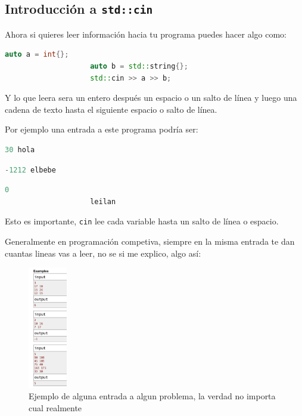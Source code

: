 \documentclass[12pt, fleqn]{report}                             %
\theoremstyle{break}                                            %
\newcommand{\textCode}[1]  { \texttt{#1} }                      %
\begin{document}
                    \cite{CPPReference}

            \subsection{Introducción a \textCode{std::cin}}
            
                Ahora si quieres leer información hacia tu programa puedes hacer algo como:
                \begin{lstlisting}[language=C++, gobble=20]
                    auto a = int{};
                    auto b = std::string{};
                    std::cin >> a >> b;        
                \end{lstlisting}

                Y lo que leera sera un entero después un espacio o un salto de línea y luego una cadena de
                texto hasta el siguiente espacio o salto de línea.

                Por ejemplo una entrada a este programa podría ser:
                \begin{lstlisting}[language=C++, gobble=20]
                   30 hola
                \end{lstlisting}
                \begin{lstlisting}[language=C++, gobble=20]
                    -1212 elbebe
                \end{lstlisting}
                \begin{lstlisting}[language=C++, gobble=20]
                    0
                    leilan
                \end{lstlisting}
                
                Esto es importante, \textCode{cin} lee cada variable hasta un salto de línea o espacio.

                Generalmente en programación competiva, siempre en la misma entrada te dan cuantas lineas vas a
                leer, no se si me explico, algo así:
                \begin{figure}[h]
                    \includegraphics[width=0.15\textwidth]{InputExample}
                    \caption{Ejemplo de alguna entrada a algun problema, la verdad no importa cual realmente}
                \end{figure}
\end{document}
